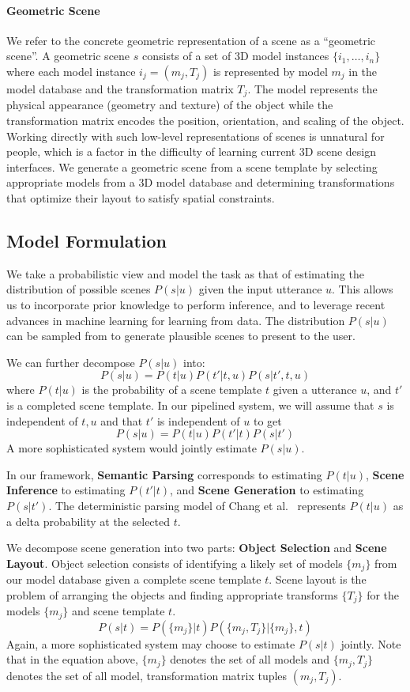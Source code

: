 \documentclass{sigchi}
\begin{document}
\paragraph{Geometric Scene}
We refer to the concrete geometric representation of a scene as a ``geometric scene''. A geometric scene $s$ consists of a set of 3D model instances $\{i_1,\ldots,i_n\}$ where each model instance $i_j = (m_j, T_j)$ is represented by model $m_j$  in the model database and the transformation matrix $T_j$.  The model represents the physical appearance (geometry and texture) of the object while the transformation matrix encodes the position, orientation, and scaling of the object.  Working directly with such low-level representations of scenes is unnatural for people, which is a factor in the difficulty of learning current 3D scene design interfaces.  We generate a geometric scene from a scene template by selecting appropriate models from a 3D model database and determining transformations that optimize their layout to satisfy spatial constraints.

\subsection{Model Formulation}
We take a probabilistic view and model the task as that of estimating the distribution of possible scenes $P(s|u)$ given the input utterance $u$.  This allows us to incorporate prior knowledge to perform inference, and to leverage recent advances in machine learning for learning from data.  The distribution $P(s|u)$ can be sampled from to generate plausible scenes to present to the user.

We can further decompose $P(s|u)$ into:
$$
P(s|u) = P(t|u) P(t'|t,u) P(s|t',t,u)
$$
where $P(t|u)$ is the probability of a scene template $t$ given a utterance $u$, and $t'$ is a completed scene template.  In our pipelined system, we will assume that $s$ is independent of $t,u$ and that $t'$ is independent of $u$ to get
$$
P(s|u) = P(t|u) P(t'|t) P(s|t')
$$
A more sophisticated system would jointly estimate $P(s|u)$.

In our framework, \textbf{Semantic Parsing} corresponds to estimating $P(t|u)$, \textbf{Scene Inference} to estimating $P(t'|t)$, and \textbf{Scene Generation} to estimating $P(s|t')$.  The deterministic parsing model of Chang et al.~ represents $P(t|u)$ as a delta probability at the selected $t$.

We decompose scene generation into two parts: \textbf{Object Selection} and \textbf{Scene Layout}.  Object selection consists of identifying a likely set of models $\{m_j\}$ from our model database given a complete scene template $t$.  Scene layout is the problem of arranging the objects and finding appropriate transforms $\{T_j\}$ for the models $\{m_j\}$ and scene template $t$.
$$
P(s|t) = P(\{m_j\}|t) P(\{m_j, T_j\}|\{m_j\},t)
$$
Again, a more sophisticated system may choose to estimate $P(s|t)$ jointly. Note that in the equation above, $\{m_j\}$ denotes the set of all models and $\{m_j, T_j\}$ denotes the set of all model, transformation matrix tuples $(m_j, T_j)$. 
\end{document}

